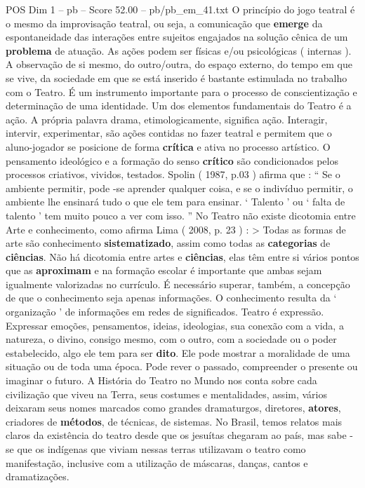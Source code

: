 \begin{textsample}{POS Dim 1 – pb – Score 52.00 – pb/pb\_em\_41.txt}
O princípio do jogo teatral é o mesmo da improvisação teatral, ou seja, a comunicação que \textbf{emerge} da espontaneidade das interações entre sujeitos engajados na solução cênica de um \textbf{problema} de atuação.
As ações podem ser físicas e/ou psicológicas ( internas ).
A observação de si mesmo, do outro/outra, do espaço externo, do tempo em que se vive, da sociedade em que se está inserido é bastante estimulada no trabalho com o Teatro.
É um instrumento importante para o processo de conscientização e determinação de uma identidade.
Um dos elementos fundamentais do Teatro é a ação.
A própria palavra drama, etimologicamente, significa ação.
Interagir, intervir, experimentar, são ações contidas no fazer teatral e permitem que o aluno-jogador se posicione de forma \textbf{crítica} e ativa no processo artístico.
O pensamento ideológico e a formação do senso \textbf{crítico} são condicionados pelos processos criativos, vividos, testados.
Spolin ( 1987, p.03 ) afirma que : “ Se o ambiente permitir, pode -se aprender qualquer coisa, e se o indivíduo permitir, o ambiente lhe ensinará tudo o que ele tem para ensinar. ‘ Talento ’ ou ‘ falta de talento ’ tem muito pouco a ver com isso. ” No Teatro não existe dicotomia entre Arte e conhecimento, como afirma Lima ( 2008, p. 23 ) : > Todas as formas de arte são conhecimento \textbf{sistematizado}, assim como todas as \textbf{categorias} de \textbf{ciências}.
Não há dicotomia entre artes e \textbf{ciências}, elas têm entre si vários pontos que as \textbf{aproximam} e na formação escolar é importante que ambas sejam igualmente valorizadas no currículo.
É necessário superar, também, a concepção de que o conhecimento seja apenas informações.
O conhecimento resulta da ‘ organização ’ de informações em redes de significados.
Teatro é expressão.
Expressar emoções, pensamentos, ideias, ideologias, sua conexão com a vida, a natureza, o divino, consigo mesmo, com o outro, com a sociedade ou o poder estabelecido, algo ele tem para ser \textbf{dito}.
Ele pode mostrar a moralidade de uma situação ou de toda uma época.
Pode rever o passado, compreender o presente ou imaginar o futuro.
A História do Teatro no Mundo nos conta sobre cada civilização que viveu na Terra, seus costumes e mentalidades, assim, vários deixaram seus nomes marcados como grandes dramaturgos, diretores, \textbf{atores}, criadores de \textbf{métodos}, de técnicas, de sistemas.
No Brasil, temos relatos mais claros da existência do teatro desde que os jesuítas chegaram ao país, mas sabe -se que os indígenas que viviam nessas terras utilizavam o teatro como manifestação, inclusive com a utilização de máscaras, danças, cantos e dramatizações.

\end{textsample}
